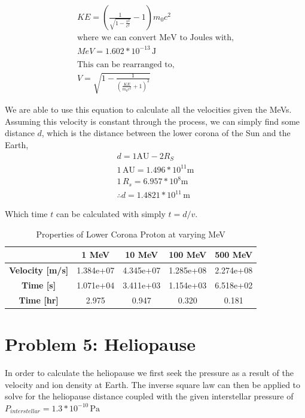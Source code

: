 \documentclass[11pt]{article}
\begin{document}
\[
\begin{gathered}
    KE = \left(\frac{1}{\sqrt{1-\frac{v^2}{c^2}}}-1\right)m_0c^2 \\
    \text{where we can convert MeV to Joules with,} \\
    MeV = 1.602*10^{-13} \, \mathrm{J} \\
    \\
    \text{This can be rearranged to,}\\
    V = \sqrt{1 - \frac{1}{(\frac{KE}{m_0 c^2}+1)^2}}
\end{gathered}
\]

We are able to use this equation to calculate all the velocities given the MeVs.
Assuming this velocity is constant through the process, we can simply find some 
distance $d$, which is the distance between the lower corona of the Sun and the Earth,
\[
\begin{gathered}
d = 1 \mathrm{AU} - 2R_{S} \\
1\, \mathrm{AU} = 1.496*10^{11} \mathrm{m} \\
1\, R_{s} = 6.957*10^8  \mathrm{m} \\
\therefore d = 1.4821*10^{11} \, \mathrm{m}
\end{gathered}
\]

Which time $t$ can be calculated with simply $t = d/v$.

\begin{table}[h]
\centering
\begin{tabular}{|c|c|c|c|c|}
\hline
\textbf{} & \textbf{1 MeV} & \textbf{10 MeV} & \textbf{100 MeV} & \textbf{500 MeV} \\
\hline
\textbf{Velocity [m/s]} & 1.384e+07 & 4.345e+07 & 1.285e+08 & 2.274e+08 \\
\hline
\textbf{Time [s]} & 1.071e+04 & 3.411e+03 & 1.154e+03 & 6.518e+02 \\
\hline
\textbf{Time [hr]} & 2.975 & 0.947 & 0.320 & 0.181 \\
\hline
\end{tabular}
\caption{Properties of Lower Corona Proton at varying MeV}
\label{tab:my_table}
\end{table}


\section*{Problem 5: Heliopause}
In order to calculate the heliopause we first seek the pressure as a result 
of the velocity and ion density at Earth. The inverse square law can then be 
applied to solve for the heliopause distance coupled with the given interstellar
pressure of $P_{interstellar} = 1.3*10^{-10} \, \mathrm{Pa}$ 
\end{document}
